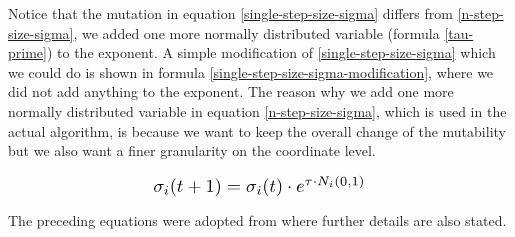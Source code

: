 Notice that the mutation in equation \ref{single-step-size-sigma} differs from \ref{n-step-size-sigma}, we added one more normally distributed variable (formula \ref{tau-prime}) to the exponent. A simple modification of \ref{single-step-size-sigma} which we could do is shown in formula \ref{single-step-size-sigma-modification}, where we did not add anything to the exponent. The reason why we add one more normally distributed variable in equation \ref{n-step-size-sigma}, which is used in the actual algorithm, is because we want to keep the overall change of the mutability but we also want a finer granularity on the coordinate level.

\begin{equation}\label{single-step-size-sigma-modification}
\scalebox{1.3}{
    $\sigma_i(t+1) = \sigma_i(t) \cdot e^{\tau \cdot N_i(0,1)}$
}
\end{equation}

The preceding equations were adopted from \cite{natural-computing-algorithms, introduction-to-evolutionary-computing} where further details are also stated.
